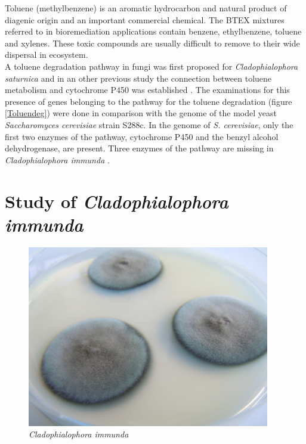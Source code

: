 \documentclass[12pt, a4paper]{report}
\begin{document}
Toluene (methylbenzene) is an aromatic hydrocarbon and natural product of diagenic origin and an important commercial chemical. The BTEX mixtures referred to in bioremediation applications contain benzene, ethylbenzene, toluene and xylenes. These toxic compounds are usually difficult to remove to their wide dispersal in ecosystem. 
\\
A toluene degradation pathway in fungi was first proposed for \textit{Cladophialophora saturnica} \cite{Badali2008} and in an other previous study the connection between toluene metabolism and cytochrome P450 was established \cite{Luykx2003}. The examinations for this presence of genes belonging to the pathway for the toluene degradation (figure \ref{Toluendeg}) were done in comparison with the genome of the model yeast \textit{Saccharomyces cerevisiae} strain S288c. In the genome of \textit{S. cerevisiae}, only the first two enzymes of the pathway, cytochrome P450 and the benzyl alcohol dehydrogenase, are present. Three enzymes of the pathway are missing in  \textit{Cladophialophora immunda} \cite{BarbaraBlasi2015, Parales2008}. \\


\section{Study of \textit{Cladophialophora immunda}}\label{study}
 \begin{figure}[H]
 	\centering	
 	\includegraphics[width=300pt]{pics/cimmunda1.JPG}
 	\caption[\textit{Cladophialophora immunda}]
 	{\textit{Cladophialophora immunda}}
 \end{figure}
 
\end{document}
